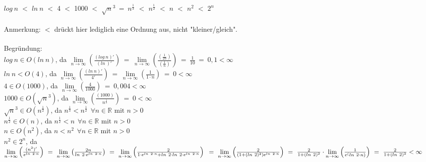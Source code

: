\documentclass[fleqn]{article}
\newcommand{\R}{\mathbb{R}}
\begin{document}
\section{}%
\subsection{}%
$log ~ n$ $<$ $ln ~ n$ $<$ 4 $<$ 1000 $<$ $\sqrt{n}^3 ~=~ n^\frac{1}{3}$ $<$ $n^{\frac{1}{2}}$ $<$ $n$ $<$ $n^2$ $<$ $2^n$ \\
\\
Anmerkung: $<$ drückt hier lediglich eine Ordnung aus, nicht "kleiner/gleich".\\
\\
Begründung:\\
$log ~ n \in O(ln ~ n)$, da $\lim\limits_{n \to \infty}
        \left(
            \frac{(log ~ n)'}{(ln ~ )'}
        \right)
    ~=~ \lim\limits_{n \to \infty}
        \left(
            \frac{
                \left(\frac{1}{2n}\right)}{
                \left(\frac{1}{n}\right)
            }
        \right)
    ~=~ \frac{1}{10} ~=~ 0,1 < \infty$ \\
$ln ~ n < O(4)$, da $\lim\limits_{n \to \infty}
        \left(
            \frac{(ln ~ n)'}{4'}
        \right)
    ~=~ \lim\limits_{n \to \infty}
        \left(
            \frac{1}{1 \cdot n}
        \right)
    ~=~ 0 < \infty$ \\
$4 \in O(1000)$, da $\lim\limits_{n \to \infty}
        \left(
            \frac{4}{1000}
        \right)
    ~=~ 0,004 < \infty$ \\
$1000 \in O(\sqrt{n}^3)$, da $\lim\limits_{n \to \infty}
    \left(
        \frac{(1000)}{n^\frac{1}{3}}
    \right)
    ~=~ 0 < \infty$\\
$\sqrt{n}^3 \in O(n^\frac{1}{2})$, da $n^\frac{1}{3} < n^\frac{1}{2} ~~ \forall n \in \R \text{ mit $n > 0$}$\\
$n^\frac{1}{2} \in O(n)$, da $n^\frac{1}{2} < n ~~ \forall n \in \R \text{ mit $n > 0$}$\\
$n \in O(n^2)$, da $n < n^2 ~~ \forall n \in \R \text{ mit $n > 0$}$\\
$n^2 \in 2^n$, da 
\begin{math}
    \lim\limits_{n \to \infty}
        \left(
            \frac{(n^2)'}{e^{ln ~ 2 \cdot n}}
        \right)
    ~=~ \lim\limits_{n \to \infty}
        \left(
            \frac{2n}{ln ~ 2 \cdot e^{ln ~ 2 \cdot n}}
        \right)
    ~=~ \lim\limits_{n \to \infty}
        \left(
            \frac{2}{1 \cdot e^{ln ~ 2 \cdot n} + ln ~ 2 \cdot ln ~ 2 \cdot e^{ln ~ 2 \cdot n}}
        \right)\\
    ~=~ \lim\limits_{n \to \infty}
        \left(
            \frac{2}{(1 + (ln ~ 2)^2) e^{ln ~ 2 \cdot n}}
        \right)
    ~=~ \frac{2}{1 + (ln ~ 2)^2} \cdot \lim\limits_{n \to \infty}
        \left(
            \frac{1}{e^(ln ~ 2 \cdot n)}
        \right)
    ~=~ \frac{2}{1 + (ln ~ 2)^2} < \infty
\end{math}
\end{document}
